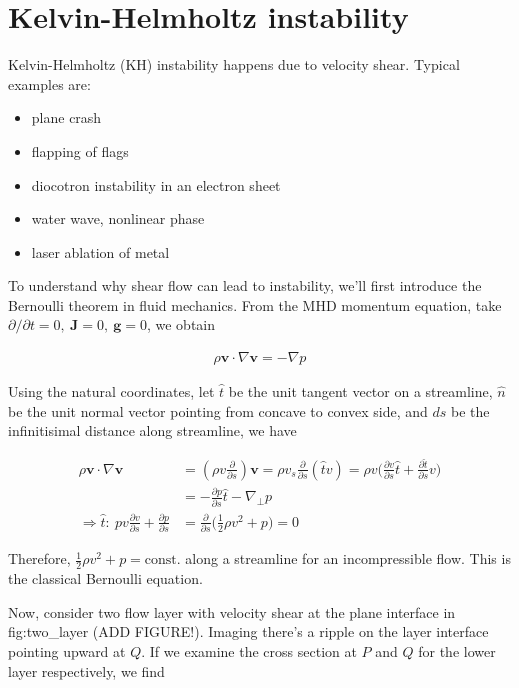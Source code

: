 \documentclass[
  notoc %
]{tufte-book}
\providecommand{\tightlist}{%
  \setlength{\itemsep}{0pt}\setlength{\parskip}{0pt}
}
\begin{document}
\hypertarget{sec:KH}{%
\section{Kelvin-Helmholtz instability}\label{sec:KH}}

Kelvin-Helmholtz (KH) instability happens due to velocity shear. Typical
examples are:

\begin{itemize}
\tightlist
\item
  plane crash
\item
  flapping of flags
\item
  diocotron instability in an electron sheet
\item
  water wave, nonlinear phase
\item
  laser ablation of metal
\end{itemize}

To understand why shear flow can lead to instability, we'll first
introduce the Bernoulli theorem in fluid mechanics. From the MHD
momentum equation, take
\(\partial/\partial t=0,\ \mathbf{J}=0,\ \mathbf{g}=0\), we obtain

\[
\begin{aligned}
\rho\mathbf{v}\cdot\nabla\mathbf{v}=-\nabla p
\end{aligned}
\]

Using the natural coordinates, let \(\hat{t}\) be the unit tangent
vector on a streamline, \(\hat{n}\) be the unit normal vector pointing
from concave to convex side, and \(ds\) be the infinitisimal distance
along streamline, we have

\[
\begin{aligned}
\rho\mathbf{v}\cdot\nabla\mathbf{v} &= (\rho v\frac{\partial }{\partial s})\mathbf{v} =\rho v_s \frac{\partial }{\partial s}(\hat{t} v) =\rho v \Big( \frac{\partial v}{\partial s}\hat{t} + \frac{\partial \hat{t}}{\partial s}v\Big) \\
&=-\frac{\partial p}{\partial s}\hat{t}-\nabla_\perp p\\
\Rightarrow \hat{t}:\ pv\frac{\partial v}{\partial s}+\frac{\partial p}{\partial s}&=\frac{\partial}{\partial s}\Big( \frac{1}{2}\rho v^2 + p \Big) = 0
\end{aligned}
\]

Therefore, \(\frac{1}{2}\rho v^2 + p = \text{const.}\) along a
streamline for an incompressible flow. This is the classical Bernoulli
equation.

Now, consider two flow layer with velocity shear at the plane interface
in fig:two\_layer (ADD FIGURE!). Imaging there's a ripple on the layer
interface pointing upward at \(Q\). If we examine the cross section at
\(P\) and \(Q\) for the lower layer respectively, we find
\end{document}
